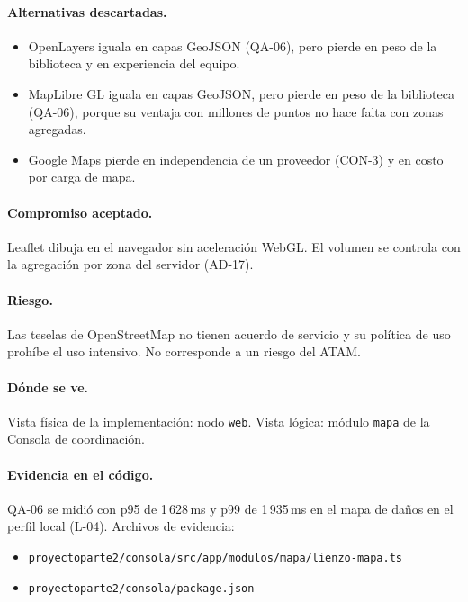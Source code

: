 \paragraph{Alternativas descartadas.}
\begin{itemize}
  \item OpenLayers iguala en capas GeoJSON (QA-06), pero pierde en peso de la biblioteca y en experiencia del equipo.
  \item MapLibre GL iguala en capas GeoJSON, pero pierde en peso de la biblioteca (QA-06), porque su ventaja con millones de puntos no hace falta con zonas agregadas.
  \item Google Maps pierde en independencia de un proveedor (CON-3) y en costo por carga de mapa.
\end{itemize}

\paragraph{Compromiso aceptado.} Leaflet dibuja en el navegador sin aceleración WebGL.
El volumen se controla con la agregación por zona del servidor (AD-17).

\paragraph{Riesgo.} Las teselas de OpenStreetMap no tienen acuerdo de servicio y su política de uso prohíbe el uso intensivo.
No corresponde a un riesgo del ATAM.

\paragraph{Dónde se ve.} Vista física de la implementación: nodo \texttt{web}.
Vista lógica: módulo \texttt{mapa} de la Consola de coordinación.

\paragraph{Evidencia en el código.} QA-06 se midió con p95 de 1\,628\,ms y p99 de 1\,935\,ms en el mapa de daños en el perfil local (L-04).
Archivos de evidencia:
{\raggedright
\begin{itemize}
  \item \texttt{proyectoparte2/\br{}consola/\br{}src/\br{}app/\br{}modulos/\br{}mapa/\br{}lienzo-mapa.ts}
  \item \texttt{proyectoparte2/\br{}consola/\br{}package.json}
\end{itemize}
\par}

